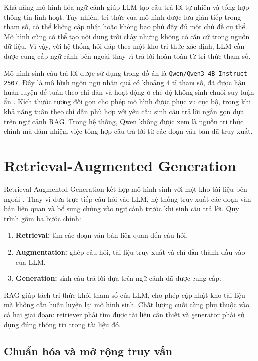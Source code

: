 \documentclass[a4paper,13pt,oneside]{report}
\begin{document}
Khả năng mô hình hóa ngữ cảnh giúp LLM tạo câu trả lời tự nhiên và tổng hợp thông tin linh hoạt. Tuy nhiên, tri thức của mô hình được lưu gián tiếp trong tham số, có thể không cập nhật hoặc không bao phủ đầy đủ một chủ đề cụ thể. Mô hình cũng có thể tạo nội dung trôi chảy nhưng không có căn cứ trong nguồn dữ liệu. Vì vậy, với hệ thống hỏi đáp theo một kho tri thức xác định, LLM cần được cung cấp ngữ cảnh bên ngoài thay vì trả lời hoàn toàn từ tri thức tham số.

Mô hình sinh câu trả lời được sử dụng trong đồ án là \texttt{Qwen/Qwen3-4B-Instruct-2507}. Đây là mô hình ngôn ngữ nhân quả có khoảng 4 tỉ tham số, đã được hậu huấn luyện để tuân theo chỉ dẫn và hoạt động ở chế độ không sinh chuỗi suy luận ẩn \cite{qwen3}. Kích thước tương đối gọn cho phép mô hình được phục vụ cục bộ, trong khi khả năng tuân theo chỉ dẫn phù hợp với yêu cầu sinh câu trả lời ngắn gọn dựa trên ngữ cảnh RAG. Trong hệ thống, Qwen không được xem là nguồn tri thức chính mà đảm nhiệm việc tổng hợp câu trả lời từ các đoạn văn bản đã truy xuất.

\section{Retrieval-Augmented Generation}

Retrieval-Augmented Generation kết hợp mô hình sinh với một kho tài liệu bên ngoài \cite{rag}. Thay vì đưa trực tiếp câu hỏi vào LLM, hệ thống truy xuất các đoạn văn bản liên quan và bổ sung chúng vào ngữ cảnh trước khi sinh câu trả lời. Quy trình gồm ba bước chính:

\begin{enumerate}[label=\arabic*)]
    \item \textbf{Retrieval:} tìm các đoạn văn bản liên quan đến câu hỏi.
    \item \textbf{Augmentation:} ghép câu hỏi, tài liệu truy xuất và chỉ dẫn thành đầu vào của LLM.
    \item \textbf{Generation:} sinh câu trả lời dựa trên ngữ cảnh đã được cung cấp.
\end{enumerate}

RAG giúp tách tri thức khỏi tham số của LLM, cho phép cập nhật kho tài liệu mà không cần huấn luyện lại mô hình sinh. Chất lượng cuối cùng phụ thuộc vào cả hai giai đoạn: retriever phải tìm được tài liệu cần thiết và generator phải sử dụng đúng thông tin trong tài liệu đó.

\subsection{Chuẩn hóa và mở rộng truy vấn}
\end{document}
